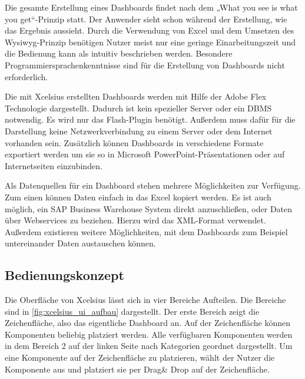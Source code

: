 \begin{onehalfspacing}
Die gesamte Erstellung eines Dashboards findet nach dem „What you see is what you get“-Prinzip statt. Der Anwender sieht schon während der Erstellung, wie das Ergebnis aussieht. Durch die Verwendung von Excel und dem Umsetzen des Wysiwyg-Prinzip benötigen Nutzer meist nur eine geringe Einarbeitungszeit und die Bedienung kann als intuitiv beschrieben werden. Besondere Programmiersprachenkenntnisse sind für die Erstellung von Dashboards nicht erforderlich.

Die mit \gls{Xcelsius} erstellten Dashboards werden mit Hilfe der Adobe Flex Technologie dargestellt. Dadurch ist kein spezieller Server oder ein \gls{DBMS} notwendig. Es wird nur das Flash-Plugin benötigt. Außerdem muss dafür für die Darstellung keine Netzwerkverbindung zu einem Server oder dem Internet vorhanden sein.  Zusätzlich können Dashboards in verschiedene Formate exportiert werden um sie so in Microsoft PowerPoint-Präsentationen oder auf Internetseiten einzubinden.

Als Datenquellen für ein Dashboard stehen mehrere Möglichkeiten zur Verfügung. Zum einen können Daten einfach in das Excel kopiert werden.  Es ist auch möglich, ein SAP Business Warehouse System direkt anzuschließen, oder Daten über Webservices zu beziehen. Hierzu wird das \gls{XML}-Format verwendet. Außerdem existieren weitere Möglichkeiten, mit dem Dashboards zum Beispiel untereinander Daten austauschen können.

\subsection{Bedienungskonzept}
Die Oberfläche von \gls{Xcelsius} lässt sich in vier Bereiche Aufteilen. Die Bereiche sind in \vref{fig:xcelsius_ui_aufbau} dargestellt. Der erste Bereich zeigt die Zeichenfläche, also das eigentliche Dashboard an. Auf der Zeichenfläche können Komponenten beliebig platziert werden. Alle verfügbaren Komponenten werden in dem Bereich 2 auf der linken Seite nach Kategorien geordnet dargestellt. Um eine Komponente auf der Zeichenfläche zu platzieren, wählt der Nutzer die Komponente aus und platziert sie per Drag\& Drop auf der Zeichenfläche. 


\end{onehalfspacing}
